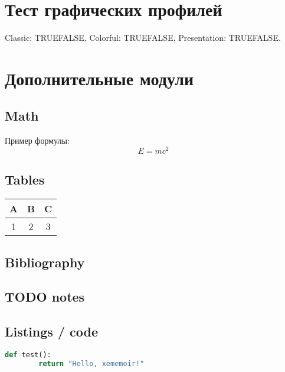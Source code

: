 \documentclass[12pt]{memoir}
\begin{document}
	\chapter{Тест графических профилей}
	Classic: \if@xemg@classic TRUE\else FALSE\fi,
	Colorful: \if@xemg@colorful TRUE\else FALSE\fi,
	Presentation: \if@xemg@presentation TRUE\else FALSE\fi.


	\chapter{Дополнительные модули}

	\section{Math}
	Пример формулы:
	\[
	E = mc^2
	\]

	\section{Tables}
	\begin{tabular}{|c|c|c|}
		\hline
		A & B & C \\
		\hline
		1 & 2 & 3 \\
		\hline
	\end{tabular}

	\section{Bibliography}
	\cite{dummyref} %

	\section{TODO notes}

	\section{Listings / code}
	\begin{lstlisting}[language=Python]
		def test():
		return "Hello, xememoir!"
	\end{lstlisting}
\end{document}
